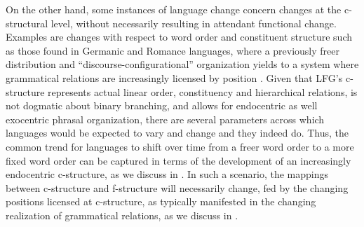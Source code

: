 \documentclass[output=paper,hidelinks]{langscibook}
\begin{document}
On the other hand, some instances of language change concern changes at the c-structural level, without necessarily resulting in attendant functional change.  Examples are changes with respect to word order and constituent structure such as those found in Germanic and Romance languages, where a previously freer distribution and ``discourse-configur\-ational'' organization \citep{Kiss1995} yields to a system where grammatical relations are increasingly licensed by position  
\citep{Kiparsky95,kips97,hinterhoelzl-petrova2010,luraghi2010configurationality,ledgeway2012latin,ponti2018non,Booth17,booth-schaetzle:2019-cr,booth-beck20200jhs}.
Given that LFG's c-structure represents actual linear order, constituency and hierarchical relations, is not dogmatic about binary branching, and allows for endocentric as well exocentric phrasal organization, there are several parameters across which languages would be expected to vary and change and they indeed do. 
Thus, the common trend for languages to shift over time from a freer word order to a more fixed word order can be captured in terms of the development of an increasingly endocentric c-structure, as we discuss  in . In such a scenario, the mappings between c-structure and f-structure will necessarily change, fed by the changing positions licensed at c-structure, as typically manifested in the changing realization of grammatical relations, as we discuss in . 
\end{document}
